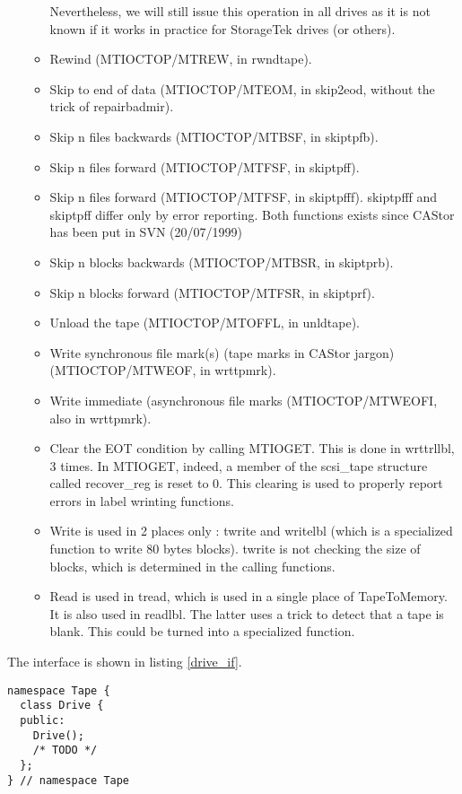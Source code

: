 \begin{itemize}
\begin{itemize}
          Nevertheless, we will still issue this operation in all drives as it is not known
          if it works in practice for StorageTek drives (or others).
    \item Rewind (MTIOCTOP/MTREW, in rwndtape).
    \item Skip to end of data (MTIOCTOP/MTEOM, in skip2eod, without the trick of repairbadmir).
    \item Skip n files backwards (MTIOCTOP/MTBSF, in skiptpfb).
    \item Skip n files forward (MTIOCTOP/MTFSF, in skiptpff).
    \item Skip n files forward (MTIOCTOP/MTFSF, in skiptpfff). skiptpfff and skiptpff differ only 
          by error reporting. Both functions exists since CAStor has been put in SVN (20/07/1999)
    \item Skip n blocks backwards (MTIOCTOP/MTBSR, in skiptprb).
    \item Skip n blocks forward (MTIOCTOP/MTFSR, in skiptprf).
    \item Unload the tape (MTIOCTOP/MTOFFL, in unldtape).
    \item Write synchronous file mark(s) (tape marks in CAStor jargon) (MTIOCTOP/MTWEOF, in wrttpmrk).
    \item Write immediate (asynchronous file marks (MTIOCTOP/MTWEOFI, also in wrttpmrk).
    \item Clear the EOT condition by calling MTIOGET. This is done in wrttrllbl, 3 times.
          In MTIOGET, indeed, a member of the scsi\_tape structure called recover\_reg is reset to 0.
          This clearing is used to properly report errors in label wrinting functions.
    \item Write is used in 2 places only : twrite and writelbl (which is a specialized 
          function to write 80 bytes blocks). twrite is not checking the size of blocks,
          which is determined in the calling functions.
    \item Read is used in tread, which is used in a single place of TapeToMemory. It is 
          also used in readlbl. The latter uses a trick to detect that a tape is blank.
          This could be turned into a specialized function.
  \end{itemize}
\end{itemize}

The interface is shown in listing \ref{drive_if}.

\begin{table}
\begin{lstlisting}[caption=Tape::Drive interface,label=drive_if]
namespace Tape {
  class Drive {
  public:
    Drive();
    /* TODO */
  };
} // namespace Tape
\end{lstlisting}
\end{table}
